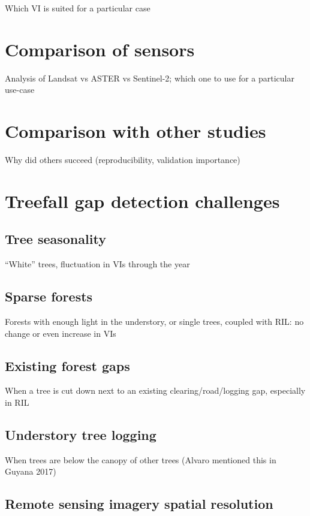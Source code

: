 \documentclass[a4paper,12pt]{scrbook}
\begin{document}
Which VI is suited for a particular case

\section{Comparison of sensors}

Analysis of Landsat vs ASTER vs Sentinel-2; which one to use for a particular use-case

\section{Comparison with other studies}

Why did others succeed (reproducibility, validation importance)

\section{Treefall gap detection challenges}

\subsection{Tree seasonality}

``White'' trees, fluctuation in VIs through the year

\subsection{Sparse forests}

Forests with enough light in the understory, or single trees, coupled with \ac{RIL}: no change or even increase in VIs

\subsection{Existing forest gaps}

When a tree is cut down next to an existing clearing/road/logging gap, especially in \ac{RIL}

\subsection{Understory tree logging}

When trees are below the canopy of other trees (Alvaro mentioned this in Guyana 2017)

\subsection{Remote sensing imagery spatial resolution}
\end{document}
